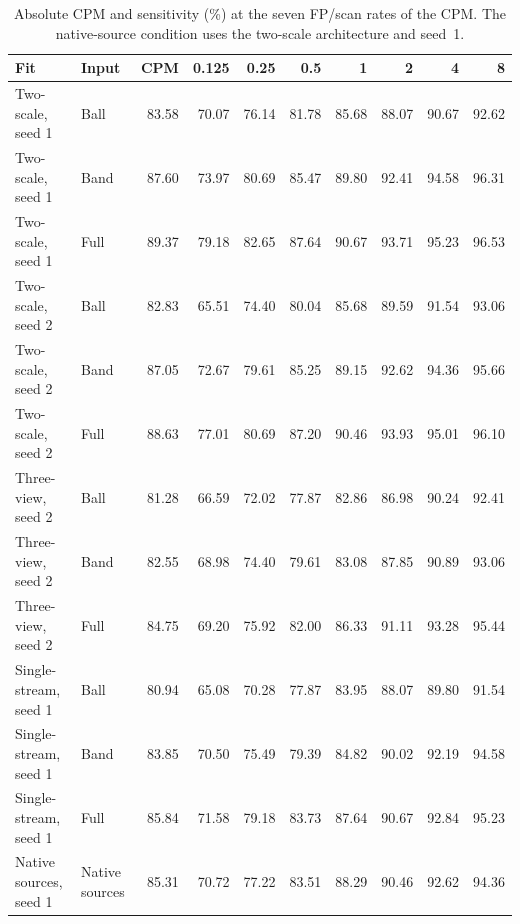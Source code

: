 \begin{table}[!t]
\centering
\footnotesize\setlength{\tabcolsep}{4pt}
\caption{Absolute CPM and sensitivity (\%) at the seven FP/scan rates of the CPM. The native-source condition uses the two-scale architecture and seed~1.}
\label{tab:absolute}
\begin{tabular}{@{}llrrrrrrrr@{}}
\toprule
Fit & Input & CPM & 0.125 & 0.25 & 0.5 & 1 & 2 & 4 & 8 \\
\midrule
Two-scale, seed 1 & Ball & 83.58 & 70.07 & 76.14 & 81.78 & 85.68 & 88.07 & 90.67 & 92.62 \\
Two-scale, seed 1 & Band & 87.60 & 73.97 & 80.69 & 85.47 & 89.80 & 92.41 & 94.58 & 96.31 \\
Two-scale, seed 1 & Full & 89.37 & 79.18 & 82.65 & 87.64 & 90.67 & 93.71 & 95.23 & 96.53 \\
\midrule
Two-scale, seed 2 & Ball & 82.83 & 65.51 & 74.40 & 80.04 & 85.68 & 89.59 & 91.54 & 93.06 \\
Two-scale, seed 2 & Band & 87.05 & 72.67 & 79.61 & 85.25 & 89.15 & 92.62 & 94.36 & 95.66 \\
Two-scale, seed 2 & Full & 88.63 & 77.01 & 80.69 & 87.20 & 90.46 & 93.93 & 95.01 & 96.10 \\
\midrule
Three-view, seed 2 & Ball & 81.28 & 66.59 & 72.02 & 77.87 & 82.86 & 86.98 & 90.24 & 92.41 \\
Three-view, seed 2 & Band & 82.55 & 68.98 & 74.40 & 79.61 & 83.08 & 87.85 & 90.89 & 93.06 \\
Three-view, seed 2 & Full & 84.75 & 69.20 & 75.92 & 82.00 & 86.33 & 91.11 & 93.28 & 95.44 \\
\midrule
Single-stream, seed 1 & Ball & 80.94 & 65.08 & 70.28 & 77.87 & 83.95 & 88.07 & 89.80 & 91.54 \\
Single-stream, seed 1 & Band & 83.85 & 70.50 & 75.49 & 79.39 & 84.82 & 90.02 & 92.19 & 94.58 \\
Single-stream, seed 1 & Full & 85.84 & 71.58 & 79.18 & 83.73 & 87.64 & 90.67 & 92.84 & 95.23 \\
\midrule
Native sources, seed 1 & Native sources & 85.31 & 70.72 & 77.22 & 83.51 & 88.29 & 90.46 & 92.62 & 94.36 \\
\bottomrule
\end{tabular}
\end{table}
